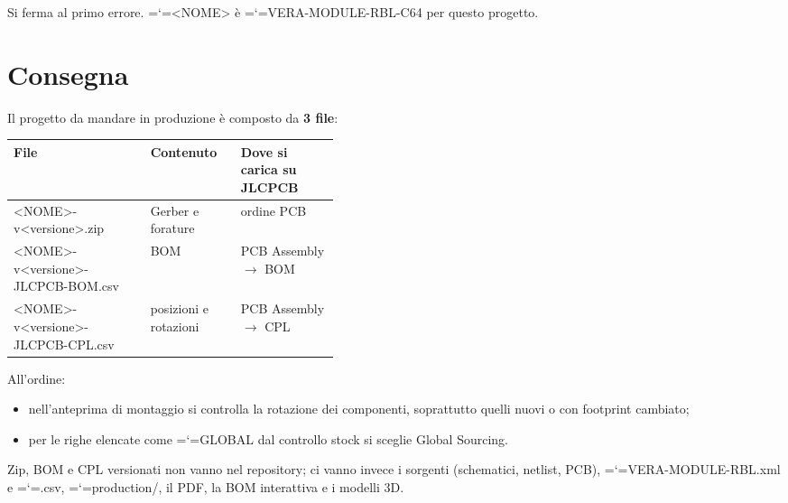 \documentclass[11pt,a4paper]{article}
\makeatletter
\newcommand{\projname}{VERA-MODULE-RBL-C64}
\newcommand{\file}[1]{{\ttfamily\hyphenchar\font=`\-\relax\language=\l@nohyphenation #1}}
\makeatother
\begin{document}
Si ferma al primo errore. \file{<NOME>} è \file{\projname} per questo progetto.

\section{Consegna}

Il progetto da mandare in produzione è composto da \textbf{3 file}:

\begin{center}
\begin{tabularx}{\linewidth}{>{\raggedright\arraybackslash\ttfamily\small}p{0.42\linewidth} L L}
\toprule
\normalfont\normalsize\textbf{File} & \textbf{Contenuto} & \textbf{Dove si carica su JLCPCB} \\
\midrule
<NOME>-v<versione>.zip             & Gerber e forature     & ordine PCB \\
<NOME>-v<versione>-JLCPCB-BOM.csv  & BOM                   & PCB Assembly $\rightarrow$ BOM \\
<NOME>-v<versione>-JLCPCB-CPL.csv  & posizioni e rotazioni & PCB Assembly $\rightarrow$ CPL \\
\bottomrule
\end{tabularx}
\end{center}

All'ordine:

\begin{itemize}[leftmargin=*]
  \item nell'anteprima di montaggio si controlla la rotazione dei componenti,
        soprattutto quelli nuovi o con footprint cambiato;
  \item per le righe elencate come \file{GLOBAL} dal controllo stock si sceglie
        Global Sourcing.
\end{itemize}

Zip, BOM e CPL versionati non vanno nel repository; ci vanno invece i sorgenti
(schematici, netlist, PCB), \file{VERA-MODULE-RBL.xml} e \file{.csv},
\file{production/}, il PDF, la BOM interattiva e i modelli 3D.
\end{document}
